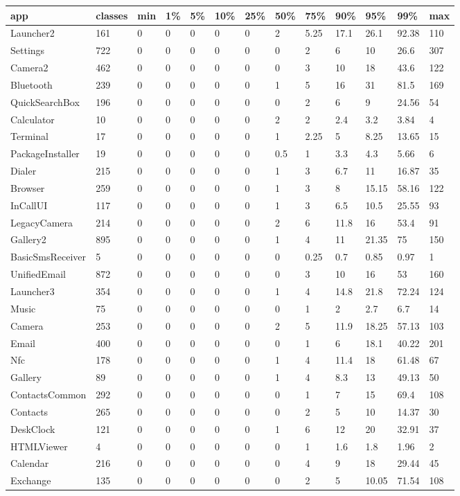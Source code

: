 \begin{tabular}{|l|l|l|l|l|l|l|l|l|l|l|l|l|}
\hline
app&classes&min&1\%&5\%&10\%&25\%&50\%&75\%&90\%&95\%&99\%&max\\
\hline
Launcher2&161&0&0&0&0&0&2&5.25&17.1&26.1&92.38&110\\
\hline
Settings&722&0&0&0&0&0&0&2&6&10&26.6&307\\
\hline
Camera2&462&0&0&0&0&0&0&3&10&18&43.6&122\\
\hline
Bluetooth&239&0&0&0&0&0&1&5&16&31&81.5&169\\
\hline
QuickSearchBox&196&0&0&0&0&0&0&2&6&9&24.56&54\\
\hline
Calculator&10&0&0&0&0&0&2&2&2.4&3.2&3.84&4\\
\hline
Terminal&17&0&0&0&0&0&1&2.25&5&8.25&13.65&15\\
\hline
PackageInstaller&19&0&0&0&0&0&0.5&1&3.3&4.3&5.66&6\\
\hline
Dialer&215&0&0&0&0&0&1&3&6.7&11&16.87&35\\
\hline
Browser&259&0&0&0&0&0&1&3&8&15.15&58.16&122\\
\hline
InCallUI&117&0&0&0&0&0&1&3&6.5&10.5&25.55&93\\
\hline
LegacyCamera&214&0&0&0&0&0&2&6&11.8&16&53.4&91\\
\hline
Gallery2&895&0&0&0&0&0&1&4&11&21.35&75&150\\
\hline
BasicSmsReceiver&5&0&0&0&0&0&0&0.25&0.7&0.85&0.97&1\\
\hline
UnifiedEmail&872&0&0&0&0&0&0&3&10&16&53&160\\
\hline
Launcher3&354&0&0&0&0&0&1&4&14.8&21.8&72.24&124\\
\hline
Music&75&0&0&0&0&0&0&1&2&2.7&6.7&14\\
\hline
Camera&253&0&0&0&0&0&2&5&11.9&18.25&57.13&103\\
\hline
Email&400&0&0&0&0&0&0&1&6&18.1&40.22&201\\
\hline
Nfc&178&0&0&0&0&0&1&4&11.4&18&61.48&67\\
\hline
Gallery&89&0&0&0&0&0&1&4&8.3&13&49.13&50\\
\hline
ContactsCommon&292&0&0&0&0&0&0&1&7&15&69.4&108\\
\hline
Contacts&265&0&0&0&0&0&0&2&5&10&14.37&30\\
\hline
DeskClock&121&0&0&0&0&0&1&6&12&20&32.91&37\\
\hline
HTMLViewer&4&0&0&0&0&0&0&1&1.6&1.8&1.96&2\\
\hline
Calendar&216&0&0&0&0&0&0&4&9&18&29.44&45\\
\hline
Exchange&135&0&0&0&0&0&0&2&5&10.05&71.54&108\\
\hline
\end{tabular}
